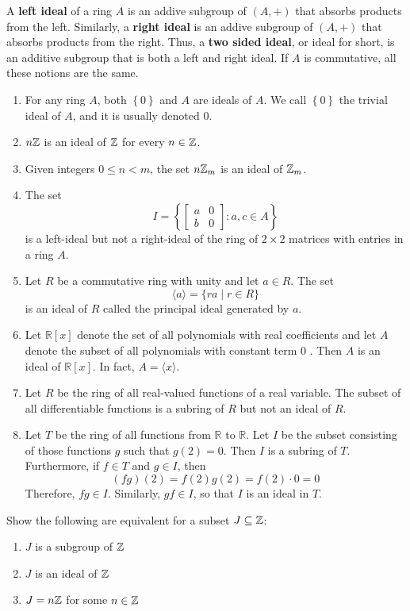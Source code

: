 \documentclass[11pt,a4paper]{article}
\begin{document}
\begin{rem}
    A \textbf{left ideal} of a ring \(A\) is an addive subgroup of \((A,+)\) that absorbs products from the left.
    Similarly,
    a \textbf{right ideal}  is an addive subgroup of \((A,+)\) that absorbs products from the right.
    Thus, a \textbf{two sided ideal}, or ideal for short,
    is an additive subgroup that is both a left and right ideal.
    If \(A\) is commutative, all these notions are the same.
\end{rem}

\begin{exa}
\begin{enumerate}[label=(\roman*)]
\item For any ring \(A\), both \(\left\{ 0 \right\} \) and \(A\) are ideals of \(A\). We call \(\left\{ 0 \right\}\) the trivial ideal of \(A\), and it is usually denoted \(0\).
\item \(n\mathbb{Z}\) is an ideal of \(\mathbb{Z}\) for every \(n\in \mathbb{Z}\).
\item Given integers \(0\leq n < m\), the set \(n \mathbb{Z}_m\) is an ideal of \(\mathbb{Z}_m\).
\item The set  $$I=\left\{\left[\begin{array}{ll}a & 0 \\ b & 0\end{array}\right]: a, c \in A\right\}$$
is a left-ideal but not a right-ideal of the ring of \(2\times 2\) matrices with entries in a ring \(A\).
\item Let $R$ be a commutative ring with unity and let $a \in R$. The set $$\langle a\rangle=\{r a \mid r \in R\}$$ is an ideal of $R$ called the principal ideal generated by $a$.  
\item  Let $\mathbb{R}[x]$ denote the set of all polynomials with real coefficients and let $A$ denote the subset of all polynomials with constant term 0 . Then $A$ is an ideal of $\mathbb{R}[x]$. In fact, $A=\langle x\rangle$.
\item  Let $R$ be the ring of all real-valued functions of a real variable. The subset  of all differentiable functions is a subring of $R$ but not an ideal of $R$.
\item Let $T$ be the ring of all functions from $\mathbb{R}$ to $\mathbb{R}$. Let $I$ be the subset consisting of those functions $g$ such that $g(2)=0$. Then $I$ is a subring of $T$. Furthermore, if $f\in T$   and   $g \in I$, then
\[
(f g)(2)=f(2) g(2)=f(2) \cdot 0=0
\]
Therefore, $f g \in I$. Similarly, $g f \in I$, so that $I$ is an ideal in $T$.
\end{enumerate}
\end{exa}

\begin{eje}
Show the following are equivalent for a subset \(J\subseteq \mathbb{Z}\):
\begin{enumerate}[label=(\roman*)]
\item \(J\) is a subgroup of \(\mathbb{Z}\)
\item \(J\) is an ideal of \(\mathbb{Z}\)
\item \(J = n \mathbb{Z}\) for some \(n\in \mathbb{Z}\)
\end{enumerate}
\end{eje}
\end{document}
